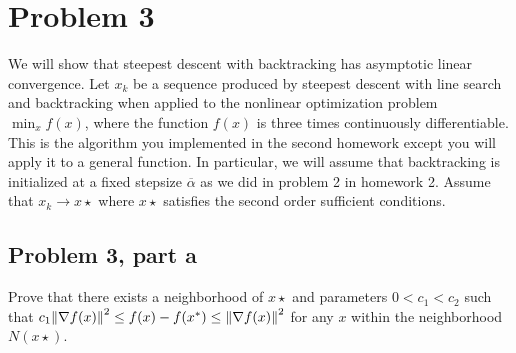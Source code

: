 \newpage
\section{Problem 3}
\newcommand{\alphabar}{\overline{\alpha}}
We will show that steepest descent with backtracking has asymptotic linear convergence. Let $x_k$ be a sequence produced by steepest descent with line search and backtracking when applied to the nonlinear optimization problem $\min_{x} f(x)$, where the function $f(x)$ is three times continuously differentiable. This is the algorithm you implemented in the second homework except you will apply it to a general function. In particular, we will assume that backtracking is initialized at a fixed stepsize $\alphabar$ as we did in problem 2 in homework 2. Assume that $x_k \rightarrow x\star$ where $x\star$ satisfies the second order sufficient conditions. 

\subsection{Problem 3, part a}
Prove that there exists a neighborhood of $x\star$ and parameters $0 < c_1 < c_2$ such that $c_1 \norm{\nabla f(x)}^2 \leq f(x) - f(x^{*}) \leq \norm{\nabla f(x)}^2$ for any $x$ within the neighborhood $N(x\star)$.
\partbreak

